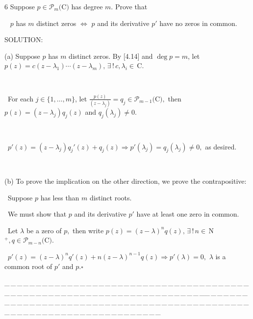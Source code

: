 \documentclass[a4paper, 11pt, UTF8]{article}
\def\Po{\mathcal{P}}
\def\Cbfc{$\,{\timesbf C}$}
\def\Nbp{$\,{\timesbf N}$^+}
\begin{document}
\begin{large}
{\timesbf\Large 6} {\timessl\Large 
Suppose $p\in\Po_m(${\timesbf C}$)$ has degree $m$. Prove that}\par\,\,\,
{\timessl\Large $p$ has $m$ distinct zeros $\Longleftrightarrow$ $p$ and its derivative $p'$ have no zeros in common.}\par
{\timesbf S\footnotesize{OLUTION:}}\par\quad
(a) Suppose $p$ has $m$ distinct zeros. By [4.14] and $\deg p=m$, let $p(z)=c(z-\lambda_1)\cdots(z-\lambda_m),\,\exists\,!\,c,\lambda_i\in\Cbfc.$\par{\tiny\,\par}\qquad\,
For each $j\in\{1,\dots,m\}$, let $\displaystyle\frac{p(z)}{(z-\lambda_j)}=q_j\in\Po_{m-1}(${\timesbf C}$),$ then $p(z)=(z-\lambda_j)q_j(z)$ and $q_j(\lambda_j)\neq 0$.\par{\tiny\,\par}\qquad\,
$p'(z)=(z-\lambda_j)q_j'(z)+q_j(z)\Rightarrow p'(\lambda_j)=q_j(\lambda_j)\neq 0,$ as desired.\par{\tiny\,\par}\quad
(b) To prove the implication on the other direction, we prove the contrapositive:\par\qquad\,
Suppose $p$ has less than $m$ distinct roots.\par\qquad\,
We must show that $p$ and its derivative $p'$ have at least one zero in common.\par\qquad\,	
Let $\lambda$ be a zero of $p,$ then write $p(z)=(z-\lambda)^n q(z),\,\exists\,!\,n\in\Nbp,q\in\Po_{m-n}(${\timesbf C}$).$\par\qquad\,
$p'(z)=(z-\lambda)^n q'(z)+n(z-\lambda)^{n-1}q(z)\Rightarrow p'(\lambda)=0,$ $\lambda$ is a common root of $p'$ and $p$.\quad$\square$\par
{\tiny \_\,\_\,\_\,\_\,\_\,\_\,\_\,\_\,\_\,\_\,\_\,\_\,\_\,\_\,\_\,\_\,\_\,\_\,\_\,\_\,\_\,\_\,\_\,\_\,\_\,\_\,\_\,\_\,\_\,\_\,\_\,\_\,\_\,\_\,\_\,\_\,\_\,\_\,\_\,\_\,\_\,\_\,\_\,\_\,\_\,\_\,\_\,\_\,\_\,\_\,\_\,\_\,\_\,\_\,\_\,\_\,\_\,\_\,\_\,\_\,\_\,\_\,\_\,\_\,\_\,\_\,\_\,\_\,\_\,\_\,\_\_\,\_\,\_\,\_\,\_\,\_\,\_\,\_\,\_\,\_\,\_\,\_\,\_\,\_\,\_\,\_\,\_\,\_\,\_\,\_\,\_\,\_\,\_\,\_\,\_\,\_\,\_\,\_\,\_\,\_\,\_\,\_\,\_\,\_\,\_\,\_\,\_\,\_\,\_\,\_\,\_\,\_\,\_\,\_\,\_\,\_\,\_\,\_\,\_\,\_\,\_\,\_\,\_\,\_\,\_\,\_\,\_\,\_\,\_\,\_\,\_\,\_\,\_\,\_\,\_\,\_\,\_\,\_\,\_\,\_\,\_}\par


\end{large}
\end{document}
